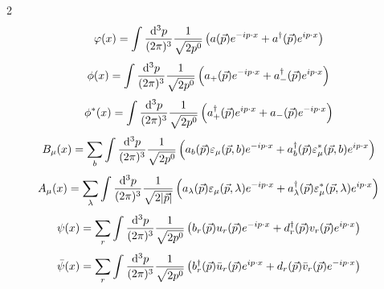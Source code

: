 \documentclass[a4paper]{article}
\newcommand*\titlet[1]{\textbf{\xmakefirstuc{#1}}}
\newenvironment{formulae}[2]{%
\vspace{-15pt}
\begin{multicols}{#1}
\noindent\titlet{#2}}
{\end{multicols}}
\begin{document}
\begin{formulae}{2}{QFT fields}
    \begin{equation*}
        \varphi(x) = \int \frac{\mathrm{d}^3 p}{(2\pi)^3} \frac1{\sqrt{2p^0}} \left(
        a(\vec p) e^{-ip\cdot x} + a^\dagger(\vec p) e^{ip\cdot x} \right)
    \end{equation*}
    \begin{equation*}
        \phi(x) = \int \frac{\mathrm{d}^3 p}{(2\pi)^3} \frac1{\sqrt{2p^0}} \left(
        a_+(\vec p) e^{-ip\cdot x} + a_-^\dagger(\vec p) e^{ip\cdot x} \right)
    \end{equation*}
    \begin{equation*}
        \phi^*(x) = \int \frac{\mathrm{d}^3 p}{(2\pi)^3} \frac1{\sqrt{2p^0}} \left(
        a_+^\dagger(\vec p) e^{ip\cdot x} + a_-(\vec p) e^{-ip\cdot x} \right)
    \end{equation*}
    \begin{equation*}
        B_\mu(x) = \sum_b \int \frac{\mathrm{d}^3 p}{(2\pi)^3}
        \frac1{\sqrt{2p^0}} \left(
        a_b(\vec p) \varepsilon_\mu(\vec p, b) e^{-ip\cdot x}
        + a_b^\dagger(\vec p) \varepsilon^*_\mu(\vec p, b) e^{ip\cdot x} \right)
    \end{equation*}
    \begin{equation*}
        A_\mu(x) = \sum_\lambda \int \frac{\mathrm{d}^3 p}{(2\pi)^3}
        \frac1{\sqrt{2|\vec p|}} \left(
        a_\lambda(\vec p) \varepsilon_\mu(\vec p, \lambda) e^{-ip\cdot x}
        + a_\lambda^\dagger(\vec p)
        \varepsilon^*_\mu(\vec p, \lambda) e^{ip\cdot x} \right)
    \end{equation*}
    \begin{equation*}
        \psi(x) = \sum_r \int \frac{\mathrm{d}^3 p}{(2\pi)^3}
        \frac1{\sqrt{2p^0}} \left(
        b_r(\vec p) u_r(\vec p) e^{-ip\cdot x}
        + d^\dagger_r(\vec p) v_r(\vec p) e^{ip\cdot x} \right)
    \end{equation*}
    \begin{equation*}
        \bar\psi(x) = \sum_r \int \frac{\mathrm{d}^3 p}{(2\pi)^3}
        \frac1{\sqrt{2p^0}} \left(
        b^\dagger_r(\vec p) \bar u_r(\vec p) e^{ip\cdot x}
        + d_r(\vec p) \bar v_r(\vec p) e^{-ip\cdot x} \right)
    \end{equation*}
\end{formulae}
\end{document}

